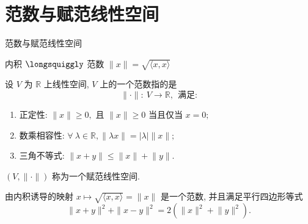 
\section[赋范空间]{范数与赋范线性空间}


\begin{frame}{范数与赋范线性空间}

内积 $\longsquiggly$ 范数 \quad $\lVert x \rVert = \sqrt{\langle x, x \rangle}$

\pause

\begin{Def}
设 $V$ 为 $\mathbb{R}$ 上线性空间, $V$ 上的一个范数指的是
\[\lVert \cdot \rVert : ~ V \longrightarrow \mathbb{R}, ~~ \text{满足:}\]
\vspace{-2em}
\begin{enumerate}
\item 正定性: $\lVert x \rVert \geqslant 0,$ 且 $\lVert x \rVert \geqslant 0$ 当且仅当 $x = 0;$
\item 数乘相容性: $\forall~\lambda \in \mathbb{R}, \lVert \lambda x \rVert = \lvert \lambda \rvert \lVert x \rVert;$
\item 三角不等式: $\lVert x + y \rVert \leqslant \lVert x \rVert + \lVert y \rVert.$
\end{enumerate}
$(V, \lVert \cdot \rVert)$ 称为一个赋范线性空间.
\end{Def}

\pause

\begin{prop}
由内积诱导的映射 $x \mapsto \sqrt{\langle x, x \rangle} = \lVert x \rVert$ 是一个范数, 并且满足平行四边形等式
\[\lVert x + y \rVert^2 + \rVert x - y \rVert^2 = 2 ( \lVert x \rVert^2 + \lVert y \rVert^2 ).\]
\end{prop}

\end{frame}


